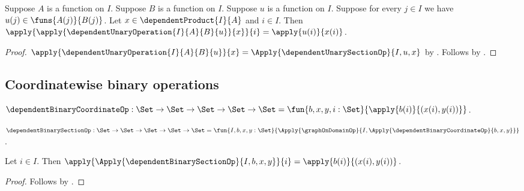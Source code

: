 \begin{proposition}\label{dependent_unary_operation_coordinate}
    Suppose $A$ is a function on $I$.
    Suppose $B$ is a function on $I$.
    Suppose $u$ is a function on $I$.
    Suppose for every $j\in I$ we have $u(j)\in\funs{A(j)}{B(j)}$.
    Let $x\in\dependentProduct{I}{A}$ and $i\in I$.
    Then
        $\apply{\apply{\dependentUnaryOperation{I}{A}{B}{u}}{x}}{i}
            =\apply{u(i)}{x(i)}$.
\end{proposition}
\begin{proof}
    $\apply{\dependentUnaryOperation{I}{A}{B}{u}}{x}
        =\Apply{\dependentUnarySectionOp}{I,u,x}$ by
        .
    Follows by .
\end{proof}

\subsection{Coordinatewise binary operations}

\begin{definition}\label{dependent_binary_coordinate_op}
    $\dependentBinaryCoordinateOp:
        \Set\to\Set\to\Set\to\Set\to\Set
        =\fun{b,x,y,i:\Set}{\apply{b(i)}{(x(i),y(i))}}$.
\end{definition}

\begin{definition}\label{dependent_binary_section_op}
    $\dependentBinarySectionOp:
        \Set\to\Set\to\Set\to\Set\to\Set
        =\fun{I,b,x,y:\Set}{
            \Apply{\graphOnDomainOp}{
                I,\Apply{\dependentBinaryCoordinateOp}{b,x,y}}}$.
\end{definition}

\begin{proposition}\label{dependent_binary_section_coordinate}
    Let $i\in I$.
    Then
        $\apply{\Apply{\dependentBinarySectionOp}{I,b,x,y}}{i}
            =\apply{b(i)}{(x(i),y(i))}$.
\end{proposition}
\begin{proof}
    Follows by
        .
\end{proof}

